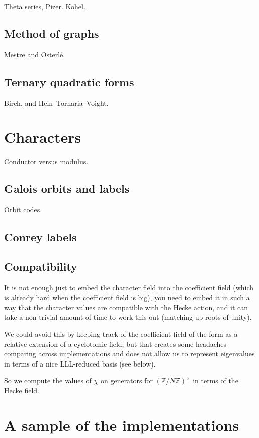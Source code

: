\documentclass[11pt]{amsart}
\numberwithin{equation}{subsection}
\theoremstyle{plain}
\theoremstyle{definition}
\newcommand{\Z}{\mathbb{Z}}
\begin{document}
Theta series, Pizer.  Kohel.  

\subsection{Method of graphs}

Mestre and Osterl\'e.  

\subsection{Ternary quadratic forms}

Birch, and Hein--Tornaria--Voight.

\section{Characters}

Conductor versus modulus.

\subsection{Galois orbits and labels}

Orbit codes.

\subsection{Conrey labels}

\subsection{Compatibility}

It is not enough just to embed the character field into the coefficient field (which is already hard when the coefficient field is big), you need to embed it in such a way that the character values are compatible with the Hecke action, and it can take a non-trivial amount of time to work this out (matching up roots of unity).

We could avoid this by keeping track of the coefficient field of the form as a relative extension of a cyclotomic field, but that creates some headaches comparing across implementations and does not allow us to represent eigenvalues in terms of a nice LLL-reduced basis (see below).  

So we compute the values of $\chi$ on generators for $(\Z/N\Z)^\times$ in terms of the Hecke field.

\section{A sample of the implementations}
\end{document}
